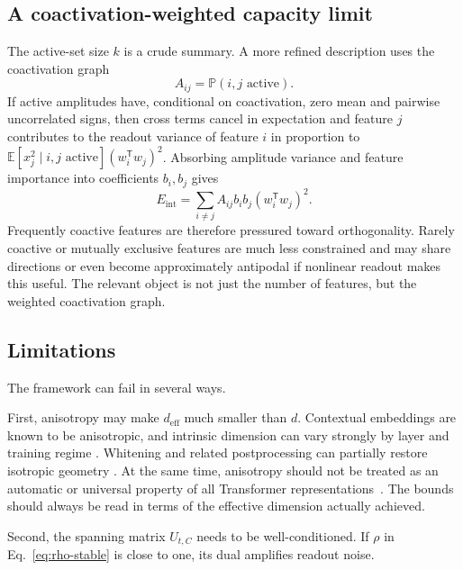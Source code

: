 \documentclass[
  aps,
  reprint,
  superscriptaddress,
  floatfix,
  nofootinbib,
  longbibliography
]{revtex4-2}
\newcommand{\E}{\mathbb{E}}
\newcommand{\Prob}{\mathbb{P}}
\newcommand{\deff}{d_{\mathrm{eff}}}
\newcommand{\Eint}{E_{\mathrm{int}}}
\newcommand{\T}{^{\mathsf{T}}}
\begin{document}
\subsection{A coactivation-weighted capacity limit}
\label{sec:capacity-limit}

The active-set size $k$ is a crude summary. A more refined description
uses the coactivation graph
%
\begin{equation}
\label{eq:coactivation}
A_{ij}=\Prob(i,j\text{ active}).
\end{equation}
%
If active amplitudes have, conditional on coactivation, zero mean and
pairwise uncorrelated signs, then cross terms cancel in expectation and
feature $j$ contributes to the readout variance of feature $i$ in
proportion to
$\E[x_j^2\mid i,j\text{ active}](w_i\T w_j)^2$. Absorbing amplitude
variance and feature importance into coefficients $b_i,b_j$ gives
%
\begin{equation}
\label{eq:int-energy}
\Eint=
\sum_{i\neq j}
A_{ij}b_i b_j (w_i\T w_j)^2 .
\end{equation}
%
Frequently coactive features are therefore pressured toward
orthogonality. Rarely coactive or mutually exclusive features are much
less constrained and may share directions or even become approximately
antipodal if nonlinear readout makes this useful. The relevant object
is not just the number of features, but the weighted coactivation graph.

\subsection{Limitations}
\label{sec:limitations}

The framework can fail in several ways.

First, anisotropy may make $\deff$ much smaller than $d$.
Contextual embeddings are known to be anisotropic, and intrinsic
dimension can vary strongly by layer and training regime
\cite{ethayarajh2019,gao2019representation,mu2018allbutthetop,razzhigaev2024shape}. Whitening and
related postprocessing can partially restore isotropic geometry
\cite{gao2019representation,mu2018allbutthetop,su2021whitening}. At the same time, anisotropy should not
be treated as an automatic or universal property of all Transformer
representations~\cite{machina2024anisotropy}. The bounds should always
be read in terms of the effective dimension actually achieved.

Second, the spanning matrix $U_{t,C}$ needs to be well-conditioned. If
$\rho$ in Eq.~\eqref{eq:rho-stable} is close to one, its dual amplifies
readout noise.
\end{document}
